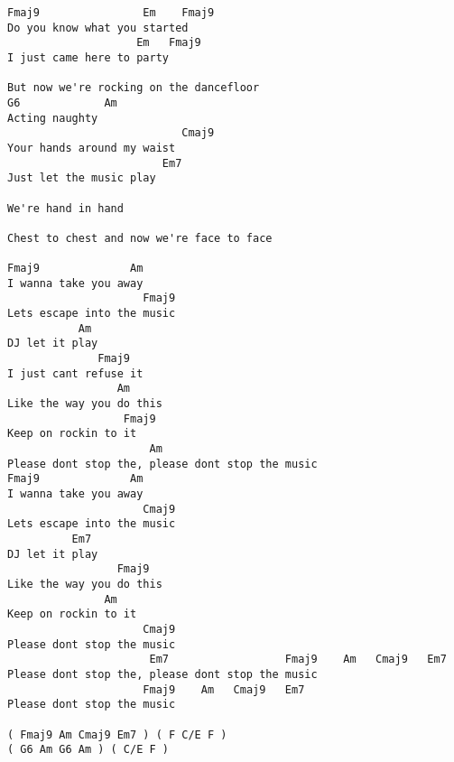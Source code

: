 \begin{verbatim}
Fmaj9                Em    Fmaj9
Do you know what you started
                    Em   Fmaj9
I just came here to party

But now we're rocking on the dancefloor
G6             Am
Acting naughty
                           Cmaj9
Your hands around my waist
                        Em7
Just let the music play

We're hand in hand

Chest to chest and now we're face to face

Fmaj9              Am
I wanna take you away
                     Fmaj9
Lets escape into the music
           Am
DJ let it play
              Fmaj9
I just cant refuse it
                 Am
Like the way you do this
                  Fmaj9
Keep on rockin to it
                      Am
Please dont stop the, please dont stop the music
Fmaj9              Am
I wanna take you away
                     Cmaj9
Lets escape into the music
          Em7
DJ let it play
                 Fmaj9
Like the way you do this
               Am
Keep on rockin to it
                     Cmaj9
Please dont stop the music
                      Em7                  Fmaj9    Am   Cmaj9   Em7
Please dont stop the, please dont stop the music
                     Fmaj9    Am   Cmaj9   Em7
Please dont stop the music

( Fmaj9 Am Cmaj9 Em7 ) ( F C/E F )
( G6 Am G6 Am ) ( C/E F ) 
\end{verbatim}